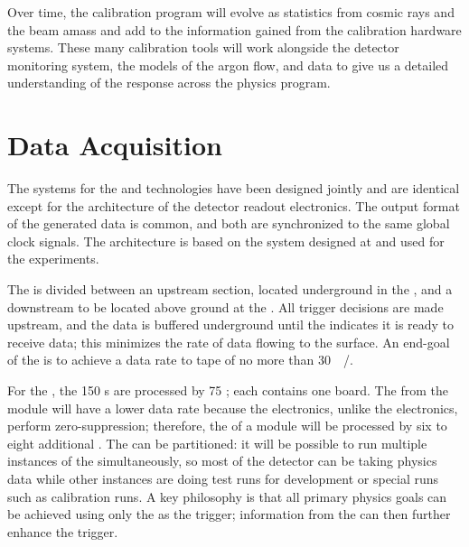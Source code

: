 Over time, the  calibration program will evolve as statistics from cosmic rays and the  beam amass and add to the information gained from the calibration hardware systems. These many calibration tools will work alongside the detector monitoring system, the  models of the argon flow, and  data to give us a detailed understanding of the  response across the  physics program.

\section{Data Acquisition}
\label{sec:exec-sp-daq}

The  systems for the  and  technologies have been designed jointly and are identical except for the architecture of the detector readout electronics.  
The output format of the generated data is common, and both are synchronized to the same global clock signals.  The  architecture is based on the  system designed at  and used for the  experiments. 

The  is divided between an upstream section, located underground in the , and a downstream  to be located above ground at the . All trigger decisions are made %
upstream, and the data is buffered underground until the  indicates it is ready to receive data; this minimizes the rate of data flowing to the surface. An end-goal of the  is to achieve a data rate to tape of no more than \SI{30}{\peta\byte/\year}.

For the , the 150 s are processed by 75 ; each  contains one  board. The  from the module will have a lower data rate because the  electronics, unlike the  electronics, perform zero-suppression; therefore, the  of a module will be processed by six to eight additional . The  can be partitioned: it will be possible to run multiple instances of the  simultaneously, so most of the detector can be taking physics data while other  instances are doing test runs for development or special runs such as calibration runs. A key philosophy is that all primary  physics goals can be achieved using only the  as the trigger; information from the  can then further enhance the trigger.

